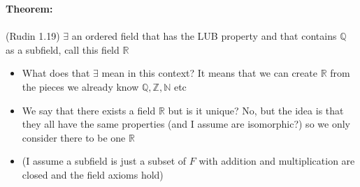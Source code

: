 \documentclass{article}
\newcommand{\Z}{\mathbb{Z}}
\newcommand{\R}{\mathbb{R}}
\newcommand{\Q}{\mathbb{Q}}
\newcommand{\N}{\mathbb{N}}
\begin{document}
\begin{theorem} 
\textbf{Theorem:} {\color{blue} } \\
~\\
(Rudin 1.19) $\exists$ an ordered field that has the LUB property and that contains $\Q$ as a subfield, call this field $\R$ 
\begin{itemize}
	\item What does that $\exists$ mean in this context? It means that we can create $\R$ from the pieces we already know $\Q, \Z, \N$ etc
	\item We say that there exists a field $\R$ but is it unique? No, but the idea is that they all have the same properties (and I assume are isomorphic?) so we only consider there to be one $\R$
	\item  (I assume a subfield is just a subset of $F$ with addition and multiplication are closed and the field axioms hold)
\end{itemize}
\end{theorem}
\end{document}
